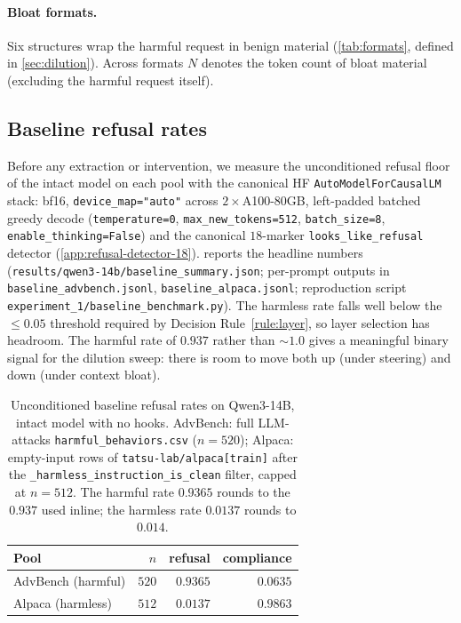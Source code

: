 \documentclass[10pt,twocolumn]{article}
\newcommand{\Ncontext}{N}
\newcommand{\model}{Qwen3-14B}
\newcommand{\advbench}{AdvBench}
\newcommand{\alpaca}{Alpaca}
\theoremstyle{definition}
\begin{document}
\paragraph{Bloat formats.}
Six structures wrap the harmful request in benign material
(\cref{tab:formats}, defined in \cref{sec:dilution}). Across formats
$\Ncontext$ denotes the token count of bloat material (excluding the
harmful request itself).

\subsection{Baseline refusal rates}
\label{sec:setup-baseline}

Before any extraction or intervention, we measure the unconditioned
refusal floor of the intact model on each pool with the canonical HF
\texttt{AutoModelForCausalLM} stack: bf16, \texttt{device\_map="auto"}
across $2{\times}$A100-80GB, left-padded batched greedy decode
(\texttt{temperature{=}0}, \texttt{max\_new\_tokens{=}512},
\texttt{batch\_size{=}8}, \texttt{enable\_thinking{=}False}) and the
canonical $18$-marker \texttt{looks\_like\_refusal} detector
(\cref{app:refusal-detector-18}).  reports the headline
numbers (\texttt{results/qwen3-14b/baseline\_summary.json}; per-prompt
outputs in \texttt{baseline\_advbench.jsonl},
\texttt{baseline\_alpaca.jsonl}; reproduction script
\texttt{experiment\_1/baseline\_benchmark.py}). The harmless rate falls
well below the $\leq 0.05$ threshold required by Decision
Rule~\ref{rule:layer}, so layer selection has headroom. The harmful
rate of $0.937$ rather than $\sim\!1.0$ gives a meaningful binary
signal for the dilution sweep: there is room to move both up (under
steering) and down (under context bloat).

\begin{table}[t]
\centering\small
\begin{tabular}{lrrr}
\toprule
Pool & $n$ & refusal & compliance \\
\midrule
\advbench{} (harmful) & $520$ & $0.9365$ & $0.0635$ \\
\alpaca{} (harmless)  & $512$ & $0.0137$ & $0.9863$ \\
\bottomrule
\end{tabular}
\caption{Unconditioned baseline refusal rates on \model{}, intact
model with no hooks. \advbench{}: full LLM-attacks
\texttt{harmful\_behaviors.csv} ($n{=}520$); \alpaca{}: empty-input
rows of \texttt{tatsu-lab/alpaca[train]} after the
\texttt{\_harmless\_instruction\_is\_clean} filter, capped at
$n{=}512$. The harmful rate $0.9365$ rounds to the $0.937$ used
inline; the harmless rate $0.0137$ rounds to $0.014$.}
\label{tab:baseline}
\end{table}
\end{document}
